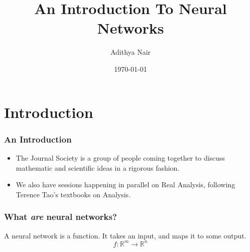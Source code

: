 \documentclass{beamer}
\title{An Introduction To Neural Networks}
\author{Adithya Nair}
\institute{The Journal Society, Amrita Vishwa Vidyapeetham}
\date{\today}
\begin{document}
\begin{frame}
\titlepage
\end{frame}
\section{Introduction}
\begin{frame}
  \frametitle{An Introduction}
  \begin{itemize}
  \item The Journal Society is a group of people coming together to discuss mathematic and scientific ideas in a rigorous fashion.
    \item  We also have sessions happening in parallel on Real Analysis, following Terence Tao's textbooks on Analysis.
  \end{itemize}
\end{frame}

\begin{frame}
  \frametitle{What \textit{are} neural networks?}
  A neural network is a function. It takes an input, and maps it to some output.
  \[f : \mathbb{R}^m \rightarrow \mathbb{R}^n\]
\end{frame}
\end{document}

